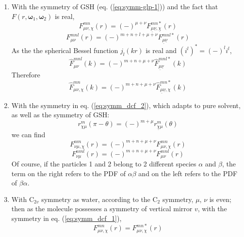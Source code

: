 \begin{enumerate}
\item With the symmetry of \acs{GSH} (eq. (\ref{eq:symm-glp-1})) and the
fact that $F(r,\boldsymbol{\omega}_{1},\boldsymbol{\omega}_{2})$
is real,
\begin{equation}
F_{\mu\nu,\chi}^{mn}(r)=\left(-\right)^{\mu+\nu}F_{\underline{\mu}\underline{\nu},\underline{\chi}}^{mn*}(r)
\end{equation}
\begin{equation}
F_{\mu\nu}^{mnl}(r)=\left(-\right)^{m+n+l+\mu+\nu}F_{\underline{\mu}\underline{\nu}}^{mnl*}(r)\label{eq:sym301}
\end{equation}
As the the spherical Bessel function $j_{l}(kr)$ is real and $\left(i^{l}\right)^{*}=\left(-\right)^{l}i^{l}$,
\begin{equation}
\hat{F}_{\mu\nu}^{mnl}(k)=\left(-\right)^{m+n+\mu+\nu}\hat{F}_{\underline{\mu}\underline{\nu}}^{mnl*}(k)\label{eq:rot-invar-symm-k-l}
\end{equation}
Therefore
\begin{equation}
\hat{F}_{\mu\nu,\chi}^{mn}(k)=\left(-\right)^{m+n+\mu+\nu}\hat{F}_{\underline{\mu}\underline{\nu},\chi}^{mn*}(k)\label{eq:rot-invar-symm-k-chi}
\end{equation}
\item With the symmetry in eq. (\ref{eq:symm_dcf_2}), which adapts to pure
solvent, as well as the symmetry of \acs{GSH}:
\begin{equation}
r_{\chi\mu}^{m}(\pi-\theta)=\left(-\right)^{m+\mu}r_{\underline{\chi}\mu}^{m}(\theta)
\end{equation}
we can find
\begin{equation}
F_{\nu\mu,\chi}^{nm}(r)=\left(-\right)^{m+n+\mu+\nu}F_{\mu\nu,\chi}^{mn}(r)
\end{equation}
\begin{equation}
F_{\nu\mu}^{nml}(r)=\left(-\right)^{m+n+\mu+\nu}F_{\mu\nu}^{mnl}(r)
\end{equation}
Of course, if the particles 1 and 2 belong to 2 different species
$\alpha$ and $\beta$, the term on the right refers to the \acs{PDF}
of $\alpha\beta$ and on the left refers to the \acs{PDF} of $\beta\alpha$.
\item With $\mathrm{C}_{2v}$ symmetry as water, according to the $\mathrm{C}_{2}$
symmetry, $\mu$, $\nu$ is even; then as the molecule possesses a
symmetry of vertical mirror $v$, with the symmetry in eq. (\ref{eq:symm_dcf_1}),
\begin{equation}
F_{\mu\nu,\chi}^{mn}(r)=F_{\mu\nu,\chi}^{mn*}(r)

\end{equation}
\end{enumerate}
